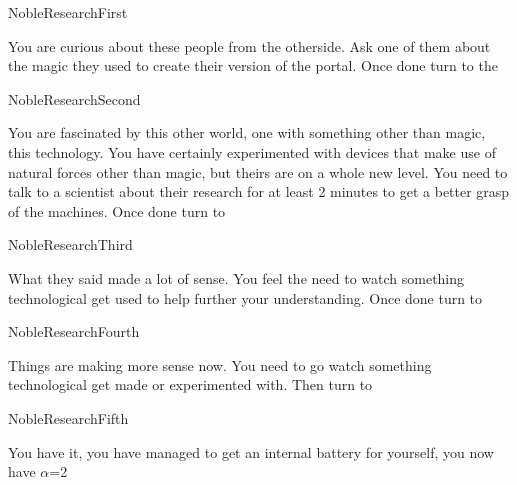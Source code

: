 \documentclass[greennotebook]{guildcamp3} %
\begin{document}
	
	\startnotebook{\nNobleOneResearch{}}
	
	\begin{page}{NobleResearchFirst}
		
		You are curious about these people from the otherside. Ask one of them about the magic they used to create their version of the portal.  Once done turn to the 
		
	\end{page}
	
	\begin{page}{NobleResearchSecond}
		
		You are fascinated by this other world, one with something other than magic, this technology. You have certainly experimented with devices that make use of natural forces other than magic, but theirs are on a whole new level. You need to talk to a scientist about their research for at least 2 minutes to get a better grasp of the machines. Once done turn to 
		
		
	\end{page}
	
	\begin{page}{NobleResearchThird}
		
		What they said made a lot of sense. You feel the need to watch something technological get used to help further your understanding. Once done turn to 
		
	\end{page}
	
	\begin{page}{NobleResearchFourth}
		
		Things are making more sense now. You need to go watch something technological get made or experimented with. Then turn to 
		
	\end{page}
	
	
	\begin{page}{NobleResearchFifth}
		
		You have it, you have managed to get an internal battery for yourself, you now have {$\alpha$}={2}
		
	\end{page}
	
	\endnotebook
	
\end{document}
